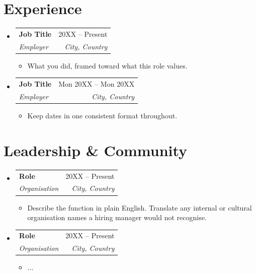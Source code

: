 \documentclass[letterpaper,11pt]{article}
\makeatletter
\newcommand{\resumeItem}[1]{
  \item\small{
    {#1 \vspace{-2pt}}
  }
}
\newcommand{\resumeSubheading}[4]{
  \vspace{-2pt}\item
    \begin{tabular*}{0.97\textwidth}[t]{l@{\extracolsep{\fill}}r}
      \textbf{#1} & #2 \\
      \textit{\small#3} & \textit{\small #4} \\
    \end{tabular*}\vspace{-7pt}
}
\newcommand{\resumeSubHeadingListStart}{\begin{itemize}[leftmargin=0.15in, label={}]}
\newcommand{\resumeSubHeadingListEnd}{\end{itemize}}
\newcommand{\resumeItemListStart}{\begin{itemize}}
\newcommand{\resumeItemListEnd}{\end{itemize}\vspace{-5pt}}
\makeatother
\begin{document}
\section{Experience}
  \resumeSubHeadingListStart

    \resumeSubheading
      {Job Title}{20XX -- Present}
      {Employer}{City, Country}
      \resumeItemListStart
        \resumeItem{What you did, framed toward what this role values.}
      \resumeItemListEnd

    \resumeSubheading
      {Job Title}{Mon 20XX -- Mon 20XX}
      {Employer}{City, Country}
      \resumeItemListStart
        \resumeItem{Keep dates in one consistent format throughout.}
      \resumeItemListEnd

  \resumeSubHeadingListEnd

\section{Leadership \& Community}
  \resumeSubHeadingListStart
    \resumeSubheading
      {Role}{20XX -- Present}
      {Organisation}{City, Country}
      \resumeItemListStart
        \resumeItem{Describe the function in plain English. Translate any internal or cultural organisation names a hiring manager would not recognise.}
      \resumeItemListEnd
    \resumeSubheading
      {Role}{20XX -- Present}
      {Organisation}{City, Country}
      \resumeItemListStart
        \resumeItem{...}
      \resumeItemListEnd
  \resumeSubHeadingListEnd

\end{document}
